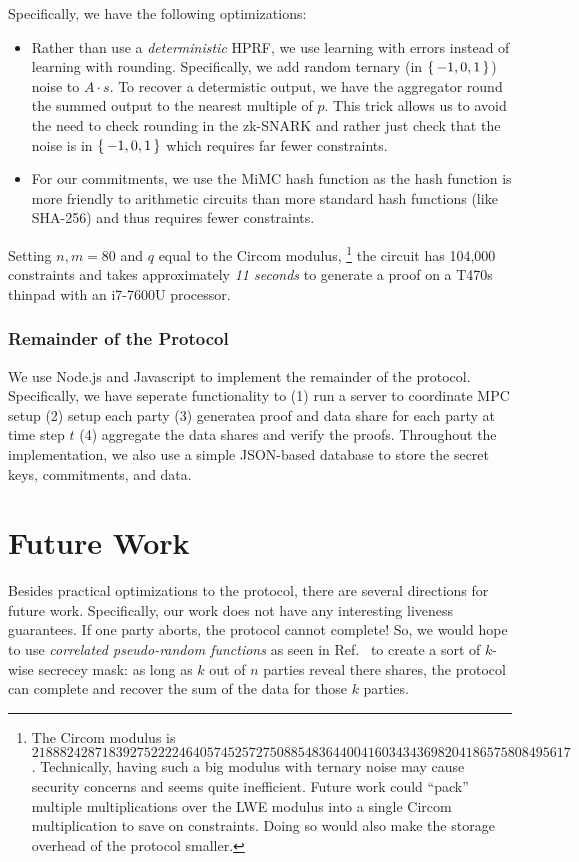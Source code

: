 Specifically, we have the following optimizations:
\begin{itemize}
	\item Rather than use a \emph{deterministic} HPRF, we use learning with errors instead of learning with rounding.
		Specifically, we add random ternary (in $\set{-1, 0, 1}$) noise to $A \cdot s$.
		To recover a determistic output, we have the aggregator round the summed output to the nearest multiple of $p$.
		This trick allows us to avoid the need to check rounding in the zk-SNARK and rather just check that the noise is in $\set{-1, 0, 1}$ which requires far fewer constraints.
	\item For our commitments, we use the MiMC hash function as the hash function is more friendly to arithmetic circuits than more standard hash functions (like SHA-256) and thus requires fewer constraints.
\end{itemize}
Setting $n, m = 80$ and $q$ equal to the Circom modulus,
\footnote{
	The Circom modulus is $21888242871839275222246405745257275088548364400416034343698204186575808495617$.
	Technically, having such a big modulus with ternary noise may cause security concerns and seems quite inefficient.
	Future work could ``pack'' multiple multiplications over the LWE modulus into a single Circom multiplication to save on constraints.
	Doing so would also make the storage overhead of the protocol smaller.
}
the circuit has 104,000 constraints and takes approximately \emph{11 seconds} to generate a proof on a T470s thinpad with an i7-7600U processor.

\subsubsection*{Remainder of the Protocol}
We use Node.js and Javascript to implement the remainder of the protocol.
Specifically, we have seperate functionality to (1) run a server to coordinate MPC setup (2) setup each party (3) generatea proof and data share for each party at time step $t$ (4) aggregate the data shares and verify the proofs.
Throughout the implementation, we also use a simple JSON-based database to store the secret keys, commitments, and data.

\section{Future Work}
Besides practical optimizations to the protocol, there are several directions for future work.
Specifically, our work does not have any interesting liveness guarantees.
If one party aborts, the protocol cannot complete!
So, we would hope to use \emph{correlated pseudo-random functions} as seen in Ref.~\cite{boyle2020correlated} to create a sort of $k$-wise secrecey mask: as long as $k$ out of $n$ parties reveal there shares, the protocol can complete and recover the sum of the data for those $k$ parties.

